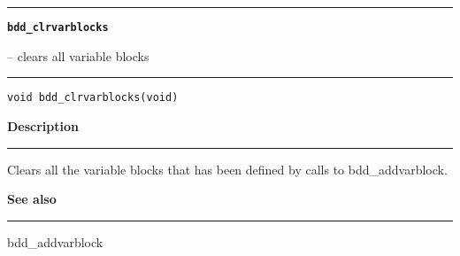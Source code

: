 \begin{minipage}{\textwidth}

\noindent\begin{minipage}{\textwidth}
\rule{\textwidth}{0.5mm}
{\tt\bf bdd\_clrvarblocks }
\--- clears all variable blocks  \hspace{\fill}
\\\rule[1.5ex]{\textwidth}{0.5mm}
\end{minipage}

\noindent\begin{verbatim}
void bdd_clrvarblocks(void) 
\end{verbatim}

\vspace{\parsep}\noindent
{\bf Description}\\\rule[1.5ex]{\textwidth}{0.2mm}\vspace{-1.5ex}\setlength{\parindent}{1em}
Clears all the variable blocks that has been defined by calls
           to bdd\_addvarblock. 

\vspace{\parsep}\vspace{\baselineskip}\noindent
{\bf See also}\\\rule[1.5ex]{\textwidth}{0.2mm}\vspace{-1.5ex}
bdd\_addvarblock 
\end{minipage}
\vspace{8ex}
